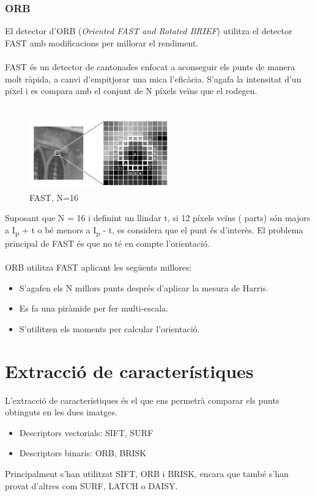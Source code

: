 	\subsubsection{ORB}
	El detector d'ORB (\textit{Oriented FAST and Rotated BRIEF}) utilitza el detector FAST amb modificacions per millorar el rendiment.\\\\
	FAST és un detector de cantonades enfocat a aconseguir els punts de manera molt ràpida, a canvi d'empitjorar una mica l'eficàcia. S'agafa la intensitat d'un píxel i es compara amb el conjunt
	de N píxels veïns que el rodegen.\\\\
	\begin{figure}[H]
		\centering
		\includegraphics[width=0.55\textwidth]{images/fast}
		\caption{FAST, N=16}
	\end{figure}
	\noindent
	Suposant que N = 16 i definint un llindar t, si 12 píxels veïns ( parts) són majors a I\textsubscript{p} + t o bé menors a I\textsubscript{p} - t, es considera que el punt és d'interès.
	El problema principal de FAST és que no té en compte l'orientació.\\\\
	ORB utilitza FAST aplicant les següents millores:\\
	\begin{itemize}
		\item{S'agafen els N millors punts després d'aplicar la mesura de Harris.}
		\item{Es fa una piràmide per fer multi-escala.}
		\item{S'utilitzen els moments per calcular l'orientació.}
	\end{itemize}

\section{Extracció de característiques}

	L'extracció de característiques és el que ens permetrà comparar els punts obtinguts en les dues imatges.\\
	\begin{itemize}
		\item{Descriptors vectorials: SIFT, SURF}
		\item{Descriptors binaris: ORB, BRISK\\}
	\end{itemize}
	Principalment s'han utilitzat SIFT, ORB i BRISK, encara que també s'han provat d'altres com SURF, LATCH o DAISY\cite{Tola10}.

